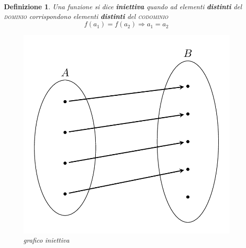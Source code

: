 \documentclass[12pt, a4paper]{article}
\theoremstyle{break}
\newtheorem{defn}{Definizione}
\theoremstyle{lemma}
\theoremstyle{lemma}
\theoremstyle{lemma}
\begin{document}
\begin{defn} Una funzione si dice \textbf{iniettiva} quando ad elementi \textbf{distinti} del \textsc{dominio} corrispondono elementi \textbf{distinti} del \textsc{codominio}\\
\begin{equation}
  f(a_1) = f(a_2) \Rightarrow a_1 = a_2
\end{equation}

\begin{figure}[ht]
	\center
	\includegraphics[scale=0.135]{iniettiva}
	\caption{grafico iniettiva}
	\label{fig:grafico_iniettiva}
\end{figure}
\end{defn}
\noindent
\end{document}
